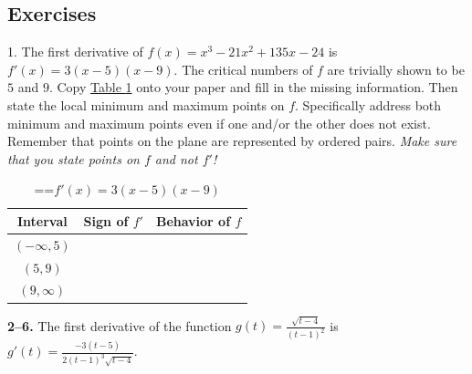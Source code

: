 \documentclass[10pt,oneside,]{book}
\theoremstyle{plain}
\theoremstyle{definition}
\numberwithin{equation}{section}
\newcommand{\fe}[2]{#1\mathopen{}\left(#2\right)\mathclose{}}
\newcommand{\ointerval}[2]{\left(#1,#2\right)}
\newcommand{\fd}[1]{#1'}
\begin{document}
\subsection[Exercises]{Exercises}\label{exercises-58}
\begin{exerciselist}
\item[1.]\hypertarget{exercise-582}{\null}The first derivative of \(\fe{f}{x}=x^3-21x^2+135x-24\) is \(\fe{\fd{f}}{x}=3(x-5)(x-9)\). The critical numbers of \(f\) are trivially shown to be \(5\) and \(9\). Copy \hyperref[table-polynomial-sign-table]{Table \ref{table-polynomial-sign-table}} onto your paper and fill in the missing information.  Then state the local minimum and maximum points on \(f\).  Specifically address both minimum and maximum points even if one and/or the other does not exist.  Remember that points on the plane are represented by ordered pairs. \emph{Make sure that you state points on \(f\) and not \(\fd{f}\)!}%
\begin{table}
\centering
\caption{\binoppenalty=\maxdimen \relpenalty=\maxdimen \(\fe{\fd{f}}{x}=3(x-5)(x-9)\)\label{table-polynomial-sign-table}}
\begin{tabular}{cp{1.5in}p{1.5in}}
\toprule
Interval&\multicolumn{1}{c}{Sign of \(\fd{f}\)}&\multicolumn{1}{c}{Behavior of \(f\)}\\
\midrule
\(\ointerval{-\infty}{5}\)&\(\phantom{\text{negative}}\)&\(\phantom{\text{decreasing}}\)\\
\midrule
\(\ointerval{5}{9}\)&&\\
\midrule
\(\ointerval{9}{\infty}\)&&\\
\bottomrule
\end{tabular}
\end{table}
\par\smallskip
\end{exerciselist}
\textbf{2--6. }\hypertarget{exercisegroup-113}{\null}The first derivative of the function \(\fe{g}{t}=\frac{\sqrt{t-4}}{(t-1)^2}\) is \(\fe{\fd{g}}{t}=\frac{-3(t-5)}{2(t-1)^3\sqrt{t-4}}\).%
\par
\end{document}
